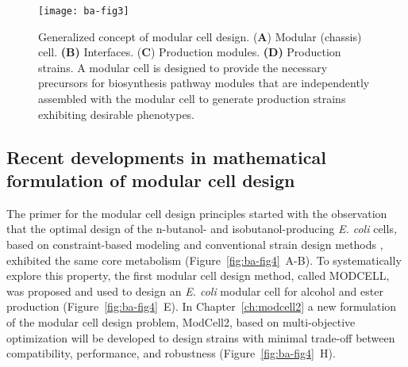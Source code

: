 \begin{figure}[!p]
  \centering
  \texttt{[image: ba-fig3]}
    \caption[Generalized concept of modular cell design]{Generalized concept of modular cell design.
    (\textbf{A}) Modular (chassis) cell. \textbf{(B)} Interfaces.
(\textbf{C}) Production modules. \textbf{(D)} Production strains. A
modular cell is designed to provide the necessary precursors for
biosynthesis pathway modules that are independently assembled with the
modular cell to generate production strains exhibiting desirable
phenotypes.}
    \label{fig:ba-fig3}
\end{figure}

\subsection{Recent developments in mathematical formulation of modular cell design}


The primer for the modular cell design principles started with the observation \citep{trinh2012} that the optimal design of the n-butanol- and isobutanol-producing \emph{E.
coli} cells\emph{,} based on constraint-based modeling \citep{palsson2015} and conventional strain design methods \citep{trinh2009}, exhibited the same core metabolism (Figure~\ref{fig:ba-fig4}~A-B).
To systematically explore this property, the first modular cell design method, called MODCELL, was proposed and used to design an \emph{E.
coli} modular cell for alcohol and ester production \citep{trinh2015} (Figure~\ref{fig:ba-fig4}~E).
In Chapter~\ref{ch:modcell2} a new formulation of the modular cell design problem, ModCell2, based on multi-objective optimization will be developed to design strains with minimal trade-off between compatibility, performance, and robustness (Figure~\ref{fig:ba-fig4}~H).


